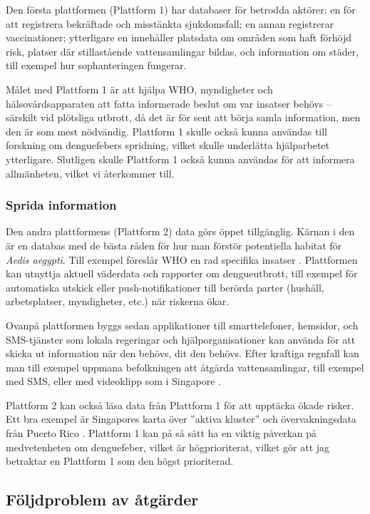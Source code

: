 \documentclass{article}
\begin{document}
Den första plattformen (Plattform 1) har databaser för betrodda aktörer: en för att registrera bekräftade och misstänkta sjukdomsfall; en annan registrerar vaccinationer; ytterligare en innehåller platsdata om områden som haft förhöjd risk, platser där stillastående vattensamlingar bildas, och information om städer, till exempel hur sophanteringen fungerar. 

Målet med Plattform 1 är att hjälpa WHO, myndigheter och hälsovårds\-apparaten att fatta informerade beslut om var insatser behövs – särskilt vid plötsliga utbrott, då det är för sent att börja samla information, men den är som mest nödvändig. Plattform 1 skulle också kunna användas till forskning om denguefebers spridning, vilket skulle underlätta hjälparbetet ytterligare. Slutligen skulle Plattform 1 också kunna användas för att informera allmänheten, vilket vi återkommer till.

\subsubsection{Sprida information}

Den andra plattformens (Plattform 2) data görs öppet tillgänglig. Kärnan i den är en databas med de bästa råden för hur man förstör potentiella habitat för \emph{Aedis aegypti}. Till exempel föreslår WHO en rad specifika insatser . Plattformen kan utnyttja aktuell väderdata och rapporter om dengueutbrott, till exempel för automatiska utskick eller push-notifikationer till berörda parter (hushåll, arbetsplatser, myndigheter, etc.) när riskerna ökar.

Ovanpå plattformen byggs sedan applikationer till smarttelefoner, hemsidor, och SMS-tjänster som lokala regeringar och hjälporganisationer kan använda för att skicka ut information när den behövs, dit den behövs. Efter kraftiga regnfall kan man till exempel uppmana befolkningen att åtgärda vattensamlingar, till exempel med SMS, eller med videoklipp som i Singapore .
 
Plattform 2 kan också läsa data från Plattform 1 för att upptäcka ökade risker. Ett bra exempel är Singapores karta över ''aktiva kluster''  och övervakningsdata från Puerto Rico . Plattform 1 kan på så sätt ha en viktig påverkan på medvetenheten om denguefeber, vilket är högprioriterat, vilket gör att jag betraktar en Plattform 1 som den högst prioriterad.

\subsection{Följdproblem av åtgärder}
\end{document}
